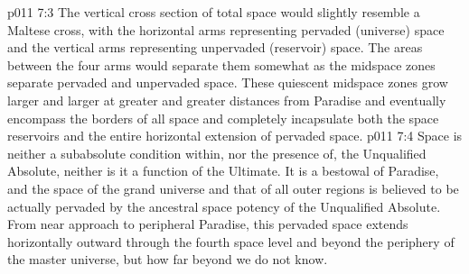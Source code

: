 \vs p011 7:3 The vertical cross section of total space would slightly resemble a Maltese cross, with the horizontal arms representing pervaded (universe) space and the vertical arms representing unpervaded (reservoir) space. The areas between the four arms would separate them somewhat as the midspace zones separate pervaded and unpervaded space. These quiescent midspace zones grow larger and larger at greater and greater distances from Paradise and eventually encompass the borders of all space and completely incapsulate both the space reservoirs and the entire horizontal extension of pervaded space.
\vs p011 7:4 \pc Space is neither a subabsolute condition within, nor the presence of, the Unqualified Absolute, neither is it a function of the Ultimate. It is a bestowal of Paradise, and the space of the grand universe and that of all outer regions is believed to be actually pervaded by the ancestral space potency of the Unqualified Absolute. From near approach to peripheral Paradise, this pervaded space extends horizontally outward through the fourth space level and beyond the periphery of the master universe, but how far beyond we do not know.
